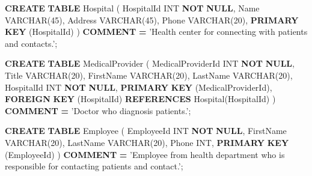 \documentclass[
]{article}
\newenvironment{Shaded}{\begin{snugshade}}{\end{snugshade}}
\newcommand{\DataTypeTok}[1]{\textcolor[rgb]{0.13,0.29,0.53}{#1}}
\newcommand{\DecValTok}[1]{\textcolor[rgb]{0.00,0.00,0.81}{#1}}
\newcommand{\KeywordTok}[1]{\textcolor[rgb]{0.13,0.29,0.53}{\textbf{#1}}}
\newcommand{\NormalTok}[1]{#1}
\newcommand{\OperatorTok}[1]{\textcolor[rgb]{0.81,0.36,0.00}{\textbf{#1}}}
\newcommand{\StringTok}[1]{\textcolor[rgb]{0.31,0.60,0.02}{#1}}
\begin{document}
\begin{Shaded}
\begin{Highlighting}[]
\KeywordTok{CREATE} \KeywordTok{TABLE}\NormalTok{ Hospital (}
\NormalTok{  HospitalId }\DataTypeTok{INT} \KeywordTok{NOT} \KeywordTok{NULL}\NormalTok{,}
\NormalTok{  Name }\DataTypeTok{VARCHAR}\NormalTok{(}\DecValTok{45}\NormalTok{),}
\NormalTok{  Address }\DataTypeTok{VARCHAR}\NormalTok{(}\DecValTok{45}\NormalTok{),}
\NormalTok{  Phone }\DataTypeTok{VARCHAR}\NormalTok{(}\DecValTok{20}\NormalTok{),}
  \KeywordTok{PRIMARY} \KeywordTok{KEY}\NormalTok{ (HospitalId)}
\NormalTok{)}
\KeywordTok{COMMENT} \OperatorTok{=} \StringTok{'Health center for connecting with patients and contacts.'}\NormalTok{;}


\KeywordTok{CREATE} \KeywordTok{TABLE}\NormalTok{ MedicalProvider (}
\NormalTok{  MedicalProviderId }\DataTypeTok{INT} \KeywordTok{NOT} \KeywordTok{NULL}\NormalTok{,}
\NormalTok{  Title }\DataTypeTok{VARCHAR}\NormalTok{(}\DecValTok{20}\NormalTok{),}
\NormalTok{  FirstName }\DataTypeTok{VARCHAR}\NormalTok{(}\DecValTok{20}\NormalTok{),}
\NormalTok{  LastName }\DataTypeTok{VARCHAR}\NormalTok{(}\DecValTok{20}\NormalTok{),}
\NormalTok{  HospitalId }\DataTypeTok{INT} \KeywordTok{NOT} \KeywordTok{NULL}\NormalTok{,}
  \KeywordTok{PRIMARY} \KeywordTok{KEY}\NormalTok{ (MedicalProviderId),}
  \KeywordTok{FOREIGN} \KeywordTok{KEY}\NormalTok{ (HospitalId)}
    \KeywordTok{REFERENCES}\NormalTok{ Hospital(HospitalId)}
\NormalTok{)}
\KeywordTok{COMMENT} \OperatorTok{=} \StringTok{'Doctor who diagnosis patients.'}\NormalTok{;}


\KeywordTok{CREATE} \KeywordTok{TABLE}\NormalTok{ Employee (}
\NormalTok{  EmployeeId }\DataTypeTok{INT} \KeywordTok{NOT} \KeywordTok{NULL}\NormalTok{,}
\NormalTok{  FirstName }\DataTypeTok{VARCHAR}\NormalTok{(}\DecValTok{20}\NormalTok{),}
\NormalTok{  LastName }\DataTypeTok{VARCHAR}\NormalTok{(}\DecValTok{20}\NormalTok{),}
\NormalTok{  Phone }\DataTypeTok{INT}\NormalTok{,}
  \KeywordTok{PRIMARY} \KeywordTok{KEY}\NormalTok{ (EmployeeId)}
\NormalTok{)}
\KeywordTok{COMMENT} \OperatorTok{=} \StringTok{'Employee from health department who is responsible for contacting patients and contact.'}\NormalTok{;}



\end{Highlighting}
\end{Shaded}
\end{document}
